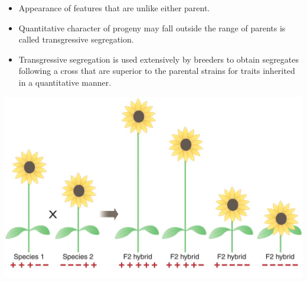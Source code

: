 \documentclass[11pt,ignorenonframetext,aspectratio=169]{beamer}
\providecommand{\tightlist}{%
  \setlength{\itemsep}{0pt}\setlength{\parskip}{0pt}}
\begin{document}
\begin{frame}{}
\protect\hypertarget{section-5}{}
\begin{itemize}
\tightlist
\item
  Appearance of features that are unlike either parent.
\item
  Quantitative character of progeny may fall outside the range of
  parents is called transgressive segregation.
\item
  Transgressive segregation is used extensively by breeders to obtain
  segregates following a cross that are superior to the parental strains
  for traits inherited in a quantitative manner.
\end{itemize}

\begin{center}\includegraphics[width=0.5\linewidth]{./images/transgressive_segregation} \end{center}
\end{frame}
\end{document}
